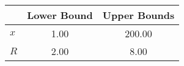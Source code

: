 \begin{tiny}\begin{tabular}{|l|c|c|}
\hline
&\textbf{Lower Bound}&\textbf{Upper Bounds}\\\hline
\textbf{$x$}&1.00&200.00\\\hline
\textbf{$R$}&2.00&8.00\\\hline
\end{tabular}
\end{tiny}